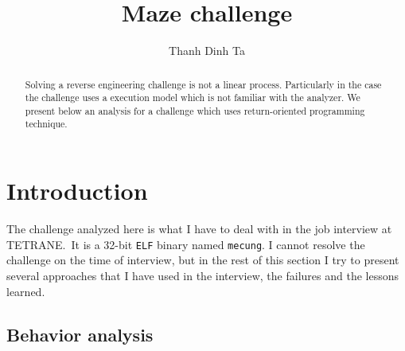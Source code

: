 \documentclass{easychair}
\begin{document}
\title{Maze challenge}

\author{
  Thanh Dinh Ta
}



\clearpage
\maketitle

\begin{abstract}
  Solving a reverse engineering challenge is not a linear process. Particularly in the case the challenge uses a execution model which is not familiar with the analyzer. We present below an analysis for a challenge which uses return-oriented programming technique.
\end{abstract}

\section{Introduction}
\label{sec:introduction}

The challenge analyzed here is what I have to deal with in the job interview at TETRANE.~It is a 32-bit \texttt{ELF} binary named \texttt{mecung}. I cannot resolve the challenge on the time of interview, but in the rest of this section I try to present several approaches that I have used in the interview, the failures and the lessons learned.


\subsection{Behavior analysis}
\label{sec:work_around}
\end{document}
